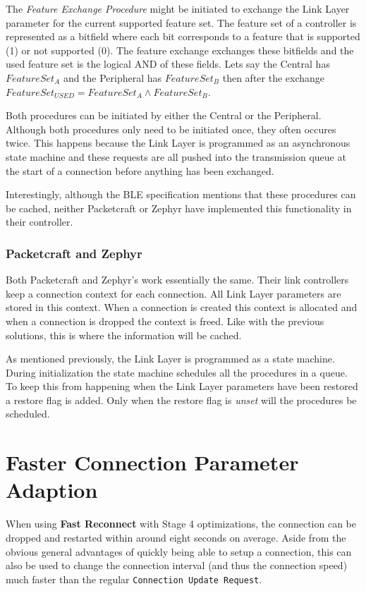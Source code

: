 The \textit{Feature Exchange Procedure} might be initiated to exchange the Link Layer parameter for the current supported feature set. The feature set of a controller is represented as a bitfield where each bit corresponds to a feature that is supported (1) or not supported (0). The feature exchange exchanges these bitfields and the used feature set is the logical AND of these fields. Lets say the Central has $FeatureSet_A$ and the Peripheral has $FeatureSet_B$ then after the exchange $FeatureSet_{USED} = FeatureSet_A \land FeatureSet_B$.

Both procedures can be initiated by either the Central or the Peripheral. Although both procedures only need to be initiated once, they often occures twice. This happens because the Link Layer is programmed as an asynchronous state machine and these requests are all pushed into the transmission queue at the start of a connection before anything has been exchanged.

Interestingly, although the BLE specification mentions that these procedures can be cached, neither Packetcraft or Zephyr have implemented this functionality in their controller. 

\subsubsection{Packetcraft and Zephyr}
Both Packetcraft and Zephyr's work essentially the same. Their link controllers keep a connection context for each connection. All Link Layer parameters are stored in this context. When a connection is created this context is allocated and when a connection is dropped the context is freed. Like with the previous solutions, this is where the information will be cached.

As mentioned previously, the Link Layer is programmed as a state machine. During initialization the state machine schedules all the procedures in a queue. To keep this from happening when the Link Layer parameters have been restored a restore flag is added. Only when the restore flag is \textit{unset} will the procedures be scheduled.

\section{Faster Connection Parameter Adaption}
When using \textbf{Fast Reconnect} with Stage 4 optimizations, the connection can be dropped and restarted within around eight seconds on average. Aside from the obvious general advantages of quickly being able to setup a connection, this can also be used to change the connection interval (and thus the connection speed) much faster than the regular \texttt{Connection Update Request}.

